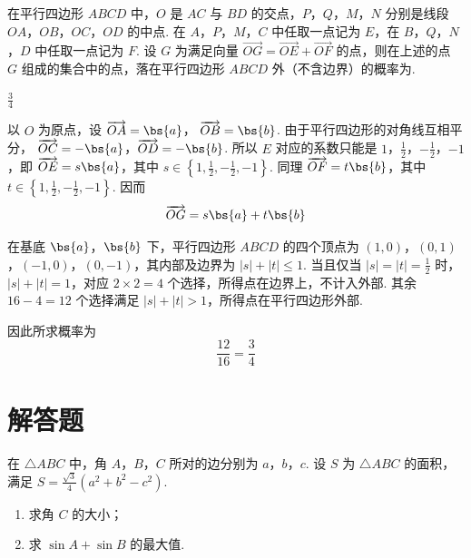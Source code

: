 \begin{problem}
在平行四边形 \(ABCD\) 中，\(O\) 是 \(AC\) 与 \(BD\) 的交点，\(P\)，\(Q\)，\(M\)，\(N\) 分别是线段 \(OA\)，\(OB\)，\(OC\)，\(OD\) 的中点. 在 \(A\)，\(P\)，\(M\)，\(C\) 中任取一点记为 \(E\)，在 \(B\)，\(Q\)，\(N\)，\(D\) 中任取一点记为 \(F\). 设 \(G\) 为满足向量 \(\overrightarrow{OG} = \overrightarrow{OE} + \overrightarrow{OF}\) 的点，则在上述的点 \(G\) 组成的集合中的点，落在平行四边形 \(ABCD\) 外（不含边界）的概率为\fillinblank{}.


\begin{answer}
\(\frac{3}{4}\)
\end{answer}

\begin{solution}
以 \(O\) 为原点，设 \(\overrightarrow{OA}=\bs{a}\)，
\(\overrightarrow{OB}=\bs{b}\). 由于平行四边形的对角线互相平分，
\(\overrightarrow{OC}=-\bs{a}\)，\(\overrightarrow{OD}=-\bs{b}\).
所以 \(E\) 对应的系数只能是
\(1\)，\(\frac12\)，\(-\frac12\)，\(-1\)，即
\(\overrightarrow{OE}=s\bs{a}\)，其中
\(s\in\left\{1,\frac12,-\frac12,-1\right\}\). 同理
\(\overrightarrow{OF}=t\bs{b}\)，其中
\(t\in\left\{1,\frac12,-\frac12,-1\right\}\). 因而
\[
\overrightarrow{OG}=s\bs{a}+t\bs{b}
\]

在基底 \(\bs{a}\)，\(\bs{b}\) 下，平行四边形 \(ABCD\) 的四个顶点为
\((1,0)\)，\((0,1)\)，\((-1,0)\)，\((0,-1)\)，其内部及边界为
\(|s|+|t|\leqslant1\). 当且仅当
\(|s|=|t|=\frac12\) 时，\(|s|+|t|=1\)，对应 \(2\times2=4\) 个选择，所得点在边界上，不计入外部. 其余 \(16-4=12\) 个选择满足
\(|s|+|t|>1\)，所得点在平行四边形外部.

因此所求概率为
\[
\frac{12}{16}=\frac34
\]
\end{solution}
\end{problem}

\section{解答题}

\begin{problem}
在 \(\triangle ABC\) 中，角 \(A\)，\(B\)，\(C\) 所对的边分别为 \(a\)，\(b\)，\(c\). 设 \(S\) 为 \(\triangle ABC\) 的面积，满足 \(S = \frac{\sqrt{3}}{4}(a^2 + b^2 - c^2)\).

\begin{enumerate}
\item 求角 \(C\) 的大小；
\item 求 \(\sin A + \sin B\) 的最大值.
\end{enumerate}
\end{problem}

